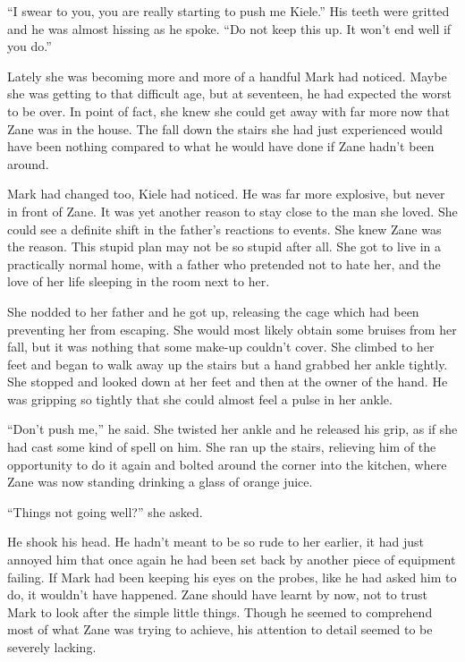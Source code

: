 ``I swear to you, you are really starting to push me Kiele.''  His teeth were gritted and he was almost hissing as he spoke.  ``Do not keep this up.  It won't end well if you do.''

Lately she was becoming more and more of a handful Mark had noticed.  Maybe she was getting to that difficult age, but at seventeen, he had expected the worst to be over.  In point of fact, she knew she could get away with far more now that Zane was in the house.  The fall down the stairs she had just experienced would have been nothing compared to what he would have done if Zane hadn't been around.  

Mark had changed too, Kiele had noticed.  He was far more explosive, but never in front of Zane.  It was yet another reason to stay close to the man she loved.  She could see a definite shift in the father's reactions to events.  She knew Zane was the reason.  This stupid plan may not be so stupid after all.  She got to live in a practically normal home, with a father who pretended not to hate her, and the love of her life sleeping in the room next to her.

She nodded to her father and he got up, releasing the cage which had been preventing her from escaping.  She would most likely obtain some bruises from her fall, but it was nothing that some make-up couldn't cover.  She climbed to her feet and began to walk away up the stairs but a hand grabbed her ankle tightly.  She stopped and looked down at her feet and then at the owner of the hand.  He was gripping so tightly that she could almost feel a pulse in her ankle.

``Don't push me,'' he said.  She twisted her ankle and he released his grip, as if she had cast some kind of spell on him.  She ran up the stairs, relieving him of the opportunity to do it again and bolted around the corner into the kitchen, where Zane was now standing drinking a glass of orange juice.

``Things not going well?'' she asked.

He shook his head.  He hadn't meant to be so rude to her earlier, it had just annoyed him that once again he had been set back by another piece of equipment failing.  If Mark had been keeping his eyes on the probes, like he had asked him to do, it wouldn't have happened.  Zane should have learnt by now, not to trust Mark to look after the simple little things.  Though he seemed to comprehend most of what Zane was trying to achieve, his attention to detail seemed to be severely lacking.

